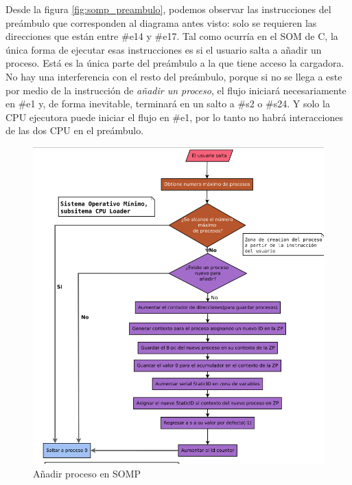 \documentclass[letterpaper,12pt,oneside]{book}
\begin{document}
                Desde la figura \ref{fig:somp_preambulo}, podemos observar las instrucciones del preámbulo que corresponden
                al diagrama antes visto: solo se requieren las direcciones que están entre \#e14 y \#e17. Tal como ocurría en el SOM de C, la única
		 		forma de ejecutar esas instrucciones es si el usuario salta a añadir un proceso. Está es la única parte del preámbulo a la que tiene
		 		acceso la cargadora.
		 		No hay una interferencia con el resto del preámbulo, 
		 		porque si no se llega a este por medio de la instrucción de \textit{añadir un proceso}, 
		 		el flujo iniciará necesariamente en \#e1 y, de forma inevitable, terminará en un salto a \#s2 o \#s24. Y solo
		 		la CPU ejecutora puede
		 		iniciar el flujo en \#e1, por lo tanto no habrá interacciones de las dos CPU en el preámbulo.
		 		
		 	
			\begin{figure}[h]		
				\centering
				\includegraphics[scale=0.43]{media/Paralela/Diagrama_SOP_add_process.png}
				\caption{ Añadir proceso en SOMP}
				\label{fig:diag_sop_add_process}
			\end{figure}	 		 			

	 		
\end{document}

